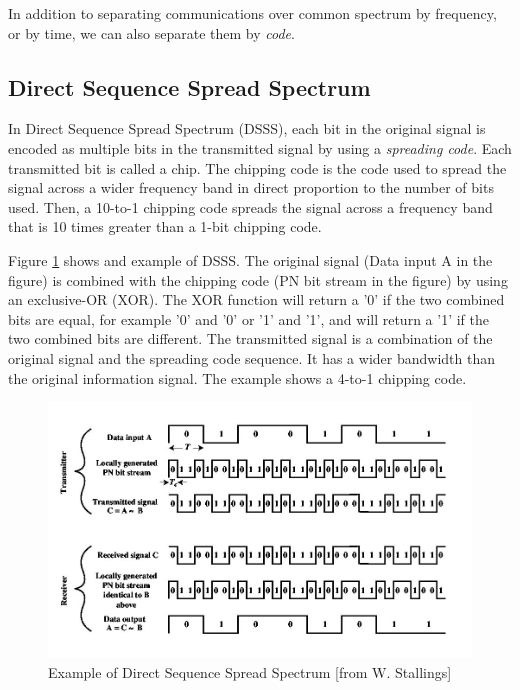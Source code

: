 In addition to separating communications over common spectrum by frequency,
or by time, we can also separate them by {\em code}. 

\subsection{Direct Sequence Spread Spectrum}
	  		
In Direct Sequence Spread Spectrum 
(DSSS), each bit in the original signal is encoded as multiple
bits in the transmitted signal by using a {\em spreading code}. 
Each transmitted bit is called a chip. The chipping
code is the code used to spread the signal across a wider frequency band in direct proportion to the number
of bits used. Then, a 10-to-1 chipping code spreads the signal across a frequency band that is 10 times
greater than a 1-bit chipping code. 

Figure \ref{DSSS} shows and example of DSSS. The original signal
(Data input A in the figure) is combined with the chipping code (PN bit stream in the figure) by using
an exclusive-OR (XOR). The XOR function will return a '0' if the two combined bits are equal, for example
'0' and '0' or '1' and '1', and will return a '1' if the two combined bits are different. The transmitted signal
is a combination of the original signal and the spreading code sequence. It has a wider bandwidth
than the original information signal. The example shows a 4-to-1 chipping code.
	  		
\begin{figure}
\begin{center}
\includegraphics[width=15 cm]{DSSS.jpg}
\caption{Example of Direct Sequence Spread Spectrum [from W. Stallings]}\label{DSSS}
\end{center}
\end{figure}

